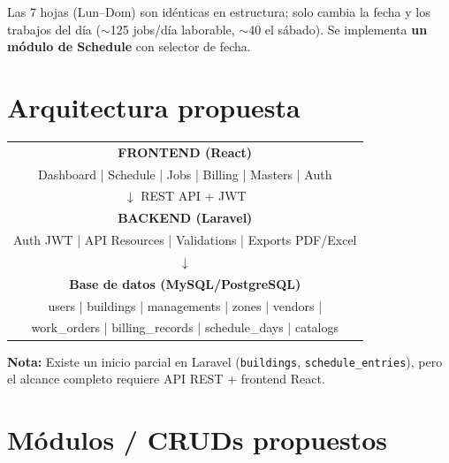\documentclass[11pt,a4paper]{article}
\begin{document}
Las 7 hojas (Lun--Dom) son id\'enticas en estructura; solo cambia la fecha y los trabajos del d\'ia ($\sim$125 jobs/d\'ia laborable, $\sim$40 el s\'abado). Se implementa \textbf{un m\'odulo de Schedule} con selector de fecha.

\section{Arquitectura propuesta}

\begin{center}
\begin{tabular}{c}
\hline
\textbf{FRONTEND (React)} \\
Dashboard | Schedule | Jobs | Billing | Masters | Auth \\
\hline
$\downarrow$ REST API + JWT \\
\hline
\textbf{BACKEND (Laravel)} \\
Auth JWT | API Resources | Validations | Exports PDF/Excel \\
\hline
$\downarrow$ \\
\hline
\textbf{Base de datos (MySQL/PostgreSQL)} \\
users | buildings | managements | zones | vendors | \\
work\_orders | billing\_records | schedule\_days | catalogs \\
\hline
\end{tabular}
\end{center}

\textbf{Nota:} Existe un inicio parcial en Laravel (\texttt{buildings}, \texttt{schedule\_entries}), pero el alcance completo requiere API REST + frontend React.

\section{M\'odulos / CRUDs propuestos}
\end{document}
